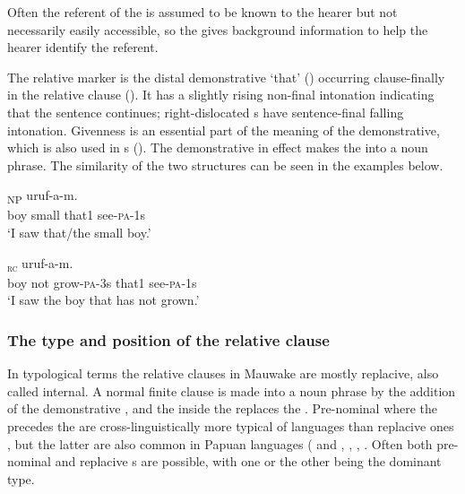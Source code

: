 Often the referent of the  is assumed to be known to the hearer but not necessarily easily accessible, so the  gives background information to help the hearer identify the referent. 

The relative marker is the distal demonstrative  `that' () occurring clause-finally in the relative clause (). It has a slightly rising non-final intonation indicating that the sentence continues; right-dislocated s have sentence-final falling intonation. Givenness is an essential part of the meaning of the demonstrative, which is also used in s (). The demonstrative in effect makes the  into a noun phrase. The similarity of the two structures can be seen in the examples below.

\ea%
\label{ex:x1527}
\textsubscript{NP}  uruf-a-m.\\
boy  small  that1  see-\textsc{pa}-1s      \\
\glt`I saw that/the small boy.'
\z


\ea%
\label{ex:x1528}
\textsubscript{\textsc{rc}}  uruf-a-m. \\
boy  not  grow-\textsc{pa}-3s that1 see-\textsc{pa}-1s \\
\glt`I saw the boy that has not grown.'
\z


\subsubsection[The type and position of the relative clause]{The type and position of the relative clause}

In typological terms the relative clauses in Mauwake are mostly replacive, also called internal. A normal finite clause is made into a noun phrase by the addition of the demonstrative , and the  inside the  replaces the . Pre-nominal  where the precedes the  are cross-linguistically more typical of  languages than replacive ones \citep[144]{Keenan1985}, but the latter are also common in Papuan languages (\citealt[229]{Reesink1983b} and \citealt[219]{Reesink1987}, \citealt[49]{Roberts1987}, \citealt[281]{Farr1999}, \citealt[193]{Whitehead2004}. Often both pre-nominal and replacive s are possible, with one or the other being the dominant type.

